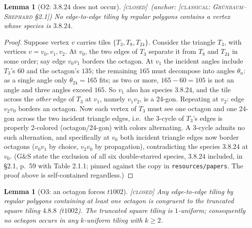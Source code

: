 \documentclass[11pt]{article}
\newtheorem{lemma}[theorem]{Lemma}
\theoremstyle{definition}
\newcommand{\CLASSICAL}[1]{\textnormal{\textsc{[classical: #1]}}}
\newcommand{\CLOSED}{\textnormal{\textsc{[closed]}}}
\begin{document}
\begin{lemma}[O2: $3.8.24$ does not occur]\label{lem:O2}
\CLOSED\ (anchor: \CLASSICAL{Gr\"unbaum--Shephard \S2.1})\;
No edge-to-edge tiling by regular polygons contains a vertex whose species is $3.8.24$.
\end{lemma}

\begin{proof}
Suppose vertex $v$ carries tiles $\{T_3, T_8, T_{24}\}$. Consider the triangle $T_3$, with
vertices $v = v_0, v_1, v_2$. At $v_0$, the two edges of $T_3$ separate it from $T_8$ and
$T_{24}$ in some order; say edge $v_0v_1$ borders the octagon. At $v_1$ the incident
angles include $T_3$'s $60$ and the octagon's $135$; the remaining $165$ must decompose
into angles $\theta_n$: as a single angle only $\theta_{24} = 165$ fits; as two or more,
$165 - 60 = 105$ is not an angle and three angles exceed $165$. So $v_1$ also has species
$3.8.24$, and the tile across the \emph{other} edge of $T_3$ at $v_1$, namely $v_1v_2$, is
a 24-gon. Repeating at $v_2$: edge $v_2v_0$ borders an octagon. Now each vertex of $T_3$
must see one octagon and one 24-gon across the two incident triangle edges, i.e.\ the
3-cycle of $T_3$'s edges is properly 2-colored (octagon/24-gon) with colors alternating.
A 3-cycle admits no such alternation, and specifically at $v_0$ both incident triangle
edges now border octagons ($v_0v_1$ by choice, $v_2v_0$ by propagation), contradicting
the species $3.8.24$ at $v_0$. (G\&S state the exclusion of all six double-starred
species, $3.8.24$ included, in \S2.1, p.~59 with Table 2.1.1; pinned against the copy in
\texttt{resources/papers}. The proof above is self-contained regardless.)
\end{proof}

\begin{lemma}[O3: an octagon forces $t1002$]\label{lem:O3} \CLOSED\;
Any edge-to-edge tiling by regular polygons containing at least one octagon is congruent
to the truncated square tiling $4.8.8$ ($t1002$). The truncated square tiling is
$1$-uniform; consequently no octagon occurs in any $k$-uniform tiling with $k \ge 2$.
\end{lemma}
\end{document}

